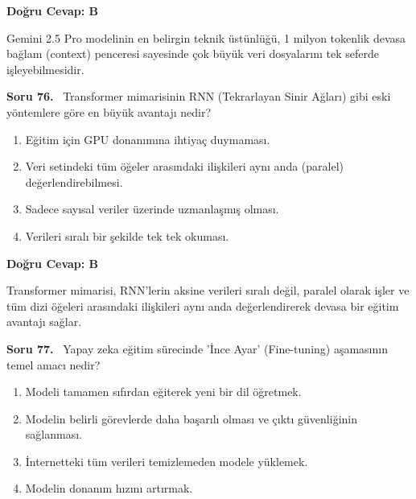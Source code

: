 \documentclass[11pt,a4paper,openany]{book}
\begin{document}
\vspace{4pt}
\begin{tcolorbox}[title=Cevap ve Açıklama, colback=gray!3!white, colframe=primarycolor!90!black, arc=2mm, fonttitle=\bfseries\sffamily, top=6pt, bottom=6pt]
    \textbf{Doğru Cevap: B}

    \vspace{2pt}
    Gemini 2.5 Pro modelinin en belirgin teknik üstünlüğü, 1 milyon tokenlik devasa bağlam (context) penceresi sayesinde çok büyük veri dosyalarını tek seferde işleyebilmesidir.
\end{tcolorbox}
\vspace{10pt}
\needspace{5cm}
\vspace{8pt}
\noindent\textbf{\large\sffamily Soru 76.} \ Transformer mimarisinin RNN (Tekrarlayan Sinir Ağları) gibi eski yöntemlere göre en büyük avantajı nedir?

\begin{enumerate}[label=\Alph*), leftmargin=25pt, topsep=4pt, itemsep=2pt]
        \item Eğitim için GPU donanımına ihtiyaç duymaması.
        \item Veri setindeki tüm öğeler arasındaki ilişkileri aynı anda (paralel) değerlendirebilmesi.
        \item Sadece sayısal veriler üzerinde uzmanlaşmış olması.
        \item Verileri sıralı bir şekilde tek tek okuması.
\end{enumerate}

\vspace{4pt}
\begin{tcolorbox}[title=Cevap ve Açıklama, colback=gray!3!white, colframe=primarycolor!90!black, arc=2mm, fonttitle=\bfseries\sffamily, top=6pt, bottom=6pt]
    \textbf{Doğru Cevap: B}

    \vspace{2pt}
    Transformer mimarisi, RNN'lerin aksine verileri sıralı değil, paralel olarak işler ve tüm dizi öğeleri arasındaki ilişkileri aynı anda değerlendirerek devasa bir eğitim avantajı sağlar.
\end{tcolorbox}
\vspace{10pt}
\needspace{5cm}
\vspace{8pt}
\noindent\textbf{\large\sffamily Soru 77.} \ Yapay zeka eğitim sürecinde 'İnce Ayar' (Fine-tuning) aşamasının temel amacı nedir?

\begin{enumerate}[label=\Alph*), leftmargin=25pt, topsep=4pt, itemsep=2pt]
        \item Modeli tamamen sıfırdan eğiterek yeni bir dil öğretmek.
        \item Modelin belirli görevlerde daha başarılı olması ve çıktı güvenliğinin sağlanması.
        \item İnternetteki tüm verileri temizlemeden modele yüklemek.
        \item Modelin donanım hızını artırmak.
\end{enumerate}
\end{document}
